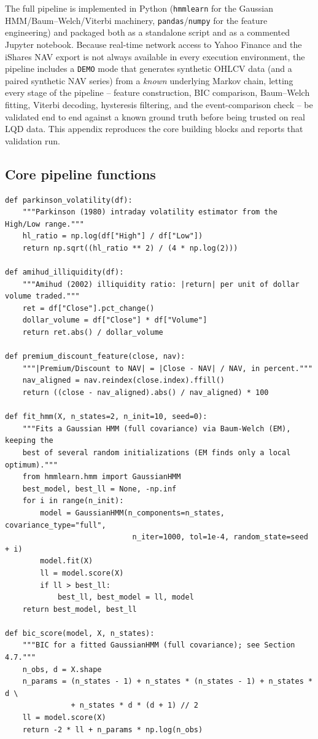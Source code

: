 \documentclass[11pt]{article}
\theoremstyle{definition}
\theoremstyle{remark}
\begin{document}
The full pipeline is implemented in Python (\texttt{hmmlearn} for the Gaussian HMM/Baum--Welch/Viterbi machinery, \texttt{pandas}/\texttt{numpy} for the feature engineering) and packaged both as a standalone script and as a commented Jupyter notebook. Because real-time network access to Yahoo Finance and the iShares NAV export is not always available in every execution environment, the pipeline includes a \texttt{DEMO} mode that generates synthetic OHLCV data (and a paired synthetic NAV series) from a \emph{known} underlying Markov chain, letting every stage of the pipeline -- feature construction, BIC comparison, Baum--Welch fitting, Viterbi decoding, hysteresis filtering, and the event-comparison check -- be validated end to end against a known ground truth before being trusted on real LQD data. This appendix reproduces the core building blocks and reports that validation run.

\subsection{Core pipeline functions}

\begin{lstlisting}
def parkinson_volatility(df):
    """Parkinson (1980) intraday volatility estimator from the High/Low range."""
    hl_ratio = np.log(df["High"] / df["Low"])
    return np.sqrt((hl_ratio ** 2) / (4 * np.log(2)))

def amihud_illiquidity(df):
    """Amihud (2002) illiquidity ratio: |return| per unit of dollar volume traded."""
    ret = df["Close"].pct_change()
    dollar_volume = df["Close"] * df["Volume"]
    return ret.abs() / dollar_volume

def premium_discount_feature(close, nav):
    """|Premium/Discount to NAV| = |Close - NAV| / NAV, in percent."""
    nav_aligned = nav.reindex(close.index).ffill()
    return ((close - nav_aligned).abs() / nav_aligned) * 100

def fit_hmm(X, n_states=2, n_init=10, seed=0):
    """Fits a Gaussian HMM (full covariance) via Baum-Welch (EM), keeping the
    best of several random initializations (EM finds only a local optimum)."""
    from hmmlearn.hmm import GaussianHMM
    best_model, best_ll = None, -np.inf
    for i in range(n_init):
        model = GaussianHMM(n_components=n_states, covariance_type="full",
                             n_iter=1000, tol=1e-4, random_state=seed + i)
        model.fit(X)
        ll = model.score(X)
        if ll > best_ll:
            best_ll, best_model = ll, model
    return best_model, best_ll

def bic_score(model, X, n_states):
    """BIC for a fitted GaussianHMM (full covariance); see Section 4.7."""
    n_obs, d = X.shape
    n_params = (n_states - 1) + n_states * (n_states - 1) + n_states * d \
               + n_states * d * (d + 1) // 2
    ll = model.score(X)
    return -2 * ll + n_params * np.log(n_obs)
\end{lstlisting}
\end{document}
